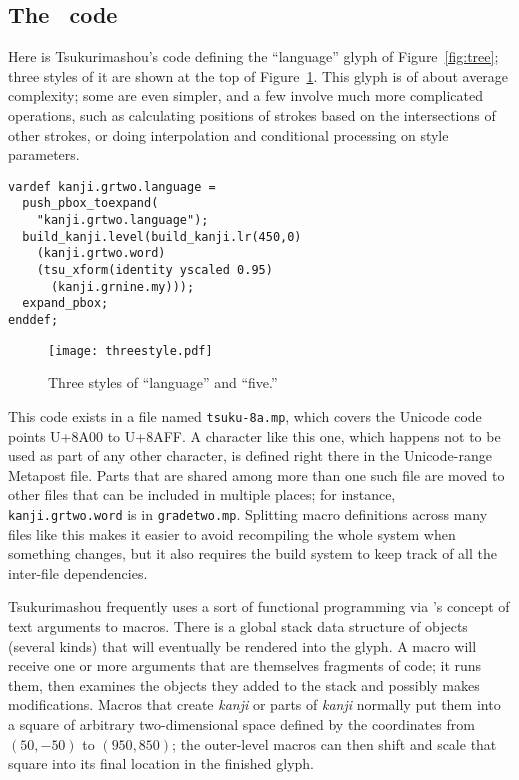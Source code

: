 \documentclass{ltugboat}
\begin{document}
\subsection{The \MF\ code}

Here is Tsukurimashou's code defining the ``language''
glyph of Figure~\ref{fig:tree}; three styles of it are shown at the top of
Figure~\ref{fig:threestyle}.  This glyph is of about
average complexity; some are even simpler, and a few involve much more
complicated operations, such as calculating positions of strokes based on
the intersections of other strokes, or doing interpolation and conditional
processing on style parameters.

\begin{verbatim}
vardef kanji.grtwo.language =
  push_pbox_toexpand(
    "kanji.grtwo.language");
  build_kanji.level(build_kanji.lr(450,0)
    (kanji.grtwo.word)
    (tsu_xform(identity yscaled 0.95)
      (kanji.grnine.my)));
  expand_pbox;
enddef;
\end{verbatim}

\begin{figure}
\texttt{[image: threestyle.pdf]}
\caption{Three styles of ``language'' and ``five.''}
\label{fig:threestyle}
\end{figure}

This code exists in a file named \verb|tsuku-8a.mp|, which covers the
Unicode code points U+8A00 to U+8AFF.  A character like this one, which
happens not to be used as part of any other character, is defined right
there in the Unicode-range Metapost file.  Parts that are shared among more
than one such file are moved to other files that can be included in multiple
places; for instance, \verb|kanji.grtwo.word| is in \verb|gradetwo.mp|. 
Splitting macro definitions across many files like this makes it easier to
avoid recompiling the whole system when something changes, but it also
requires the build system to keep track of all the inter-file dependencies.

Tsukurimashou frequently uses a sort of functional programming via \MF's
concept of text arguments to macros.  There is a global stack data structure
of objects (several kinds) that will eventually be rendered into the glyph. 
A macro will receive one or more arguments that are themselves fragments of
code; it runs them, then examines the objects they added to the stack and
possibly makes modifications.  Macros that create \emph{kanji} or parts of \emph{kanji}
normally put them into a square of arbitrary two-dimensional space
defined by the coordinates from $(50,-50)$ to $(950,850)$; the outer-level
macros can then shift and scale that square into its final location in the
finished glyph.
\end{document}
